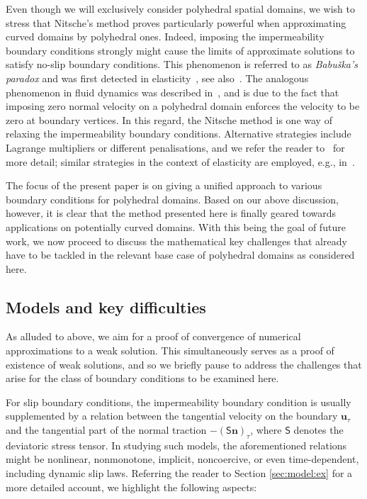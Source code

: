 \documentclass[reqno,a4paper]{amsart}
\def\tens#1{\pmb{\mathsf{#1}}}
\def\vec#1{\boldsymbol{#1}}
\def\bn{\vec{n}}
\def\bu{\vec{u}}
\def\BS{\tens{S}}
\begin{document}
	Even though we will exclusively consider polyhedral spatial domains, we wish to stress that Nitsche's method proves particularly powerful when approximating curved domains by polyhedral ones. Indeed, imposing the impermeability boundary conditions strongly might cause the limits of approximate solutions to satisfy no-slip boundary conditions. This phenomenon is referred to as \emph{Babuška's paradox} and was first detected in elasticity~\cite{Babuska1959}, see also~\cite{MNP.2000}. 
	The analogous phenomenon in fluid dynamics was described in~\cite[Sec.~5]{V.1985}, and is due to the fact that imposing zero normal velocity on a polyhedral domain enforces the velocity to be zero at boundary vertices. In this regard, the Nitsche method is one way of  relaxing the impermeability boundary conditions. 
	Alternative strategies include Lagrange multipliers or  different penalisations, and we refer the reader to~\cite{V.1987,V.1991,BaenschDeckelnick1999,Basaric2022} for more detail; similar strategies in the context of elasticity are employed, e.g., in~\cite{ChoulyFabreHildEtAl2017,BartelsTscherner2024,Gustafsson2022}. 
	
	The focus of the present paper is on giving a unified approach to various boundary conditions for polyhedral domains. 
	Based on our above discussion, however, it is clear that the method presented here is finally geared towards applications on potentially curved domains. 
	With this being the goal of future work, we now proceed to discuss the   mathematical key challenges that already have to be tackled in the relevant base case of polyhedral domains as considered here.
	
	\subsection{Models and key difficulties}
	As alluded to above, we aim for a proof of convergence of numerical approximations to a weak solution. 
	This simultaneously serves as a proof of existence of weak solutions, and so we briefly pause to address the challenges that arise for the class of boundary conditions to be examined here. 
	
	For slip boundary conditions, the impermeability boundary condition is usually supplemented by a relation between the tangential velocity on the boundary $\bu_\tau$ and the tangential part of the normal traction $- (\BS \bn)_{\tau}$, where $\BS$ denotes the deviatoric stress tensor. In studying such models, the aforementioned relations might be nonlinear, nonmonotone, implicit, noncoercive, or even time-dependent, including dynamic slip laws. Referring the reader to Section \ref{sec:model:ex} for a more detailed account, we highlight the following aspects: \\
	
\end{document}
